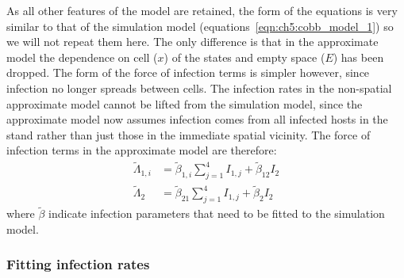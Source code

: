 As all other features of the model are retained, the form of the equations is very similar to that of the simulation model (equations~\ref{eqn:ch5:cobb_model_1}) so we will not repeat them here. The only difference is that in the approximate model the dependence on cell ($x$) of the states and empty space ($E$) has been dropped. The form of the force of infection terms is simpler however, since infection no longer spreads between cells. The infection rates in the non-spatial approximate model cannot be lifted from the simulation model, since the approximate model now assumes infection comes from all infected hosts in the stand rather than just those in the immediate spatial vicinity. The force of infection terms in the approximate model are therefore:
\begin{subequations}\label{eqn:ch6:infection_approx}
        \begin{align}
            \tilde{\Lambda}_{1,i} &= \tilde{\beta}_{1,i}\sum_{j=1}^4I_{1,j} + \tilde{\beta}_{12}I_{2} \\
            \tilde{\Lambda}_{2} &= \tilde{\beta}_{21}\sum_{j=1}^4I_{1,j} + \tilde{\beta}_{2}I_{2}
        \end{align}
\end{subequations}
where $\tilde{\beta}$ indicate infection parameters that need to be fitted to the simulation model.

\subsubsection{Fitting infection rates}

